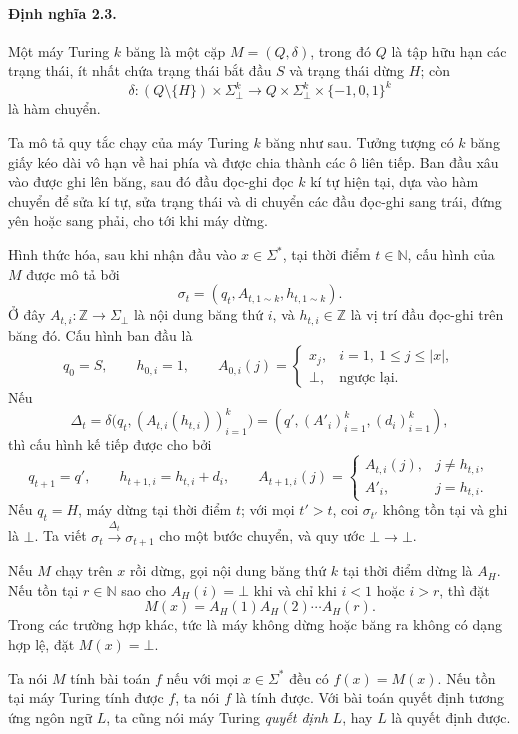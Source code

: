 \documentclass[11pt]{article}
\begin{document}
\paragraph{Định nghĩa 2.3.}
Một máy Turing \(k\) băng là một cặp \(M=(Q,\delta)\), trong đó \(Q\) là tập
hữu hạn các trạng thái, ít nhất chứa trạng thái bắt đầu \(S\) và trạng thái
dừng \(H\); còn
\[
  \delta:(Q\setminus\{H\})\times\Sigma_{\bot}^k
  \to Q\times\Sigma_{\bot}^k\times\{-1,0,1\}^k
\]
là hàm chuyển.

Ta mô tả quy tắc chạy của máy Turing \(k\) băng như sau. Tưởng tượng có \(k\)
băng giấy kéo dài vô hạn về hai phía và được chia thành các ô liên tiếp. Ban
đầu xâu vào được ghi lên băng, sau đó đầu đọc-ghi đọc \(k\) kí tự hiện tại, dựa
vào hàm chuyển để sửa kí tự, sửa trạng thái và di chuyển các đầu đọc-ghi sang
trái, đứng yên hoặc sang phải, cho tới khi máy dừng.

Hình thức hóa, sau khi nhận đầu vào \(x\in\Sigma^*\), tại thời điểm \(t\in
\mathbb N\), cấu hình của \(M\) được mô tả bởi
\[
  \sigma_t=(q_t,A_{t,1\sim k},h_{t,1\sim k}).
\]
Ở đây \(A_{t,i}:\mathbb Z\to\Sigma_{\bot}\) là nội dung băng thứ \(i\), và
\(h_{t,i}\in\mathbb Z\) là vị trí đầu đọc-ghi trên băng đó. Cấu hình ban đầu là
\[
  q_0=S,\qquad h_{0,i}=1,\qquad
  A_{0,i}(j)=
  \begin{cases}
    x_j,& i=1,\ 1\le j\le |x|,\\
    \bot,& \text{ngược lại.}
  \end{cases}
\]
Nếu
\[
  \Delta_t=\delta\bigl(q_t,(A_{t,i}(h_{t,i}))_{i=1}^{k}\bigr)
  =(q',(A'_i)_{i=1}^{k},(d_i)_{i=1}^{k}),
\]
thì cấu hình kế tiếp được cho bởi
\[
  q_{t+1}=q',\qquad h_{t+1,i}=h_{t,i}+d_i,\qquad
  A_{t+1,i}(j)=
  \begin{cases}
    A_{t,i}(j),& j\ne h_{t,i},\\
    A'_i,& j=h_{t,i}.
  \end{cases}
\]
Nếu \(q_t=H\), máy dừng tại thời điểm \(t\); với mọi \(t'>t\), coi
\(\sigma_{t'}\) không tồn tại và ghi là \(\bot\). Ta viết
\(\sigma_t\xrightarrow{\Delta_t}\sigma_{t+1}\) cho một bước chuyển, và quy ước
\(\bot\to\bot\).

Nếu \(M\) chạy trên \(x\) rồi dừng, gọi nội dung băng thứ \(k\) tại thời điểm
dừng là \(A_H\). Nếu tồn tại \(r\in\mathbb N\) sao cho \(A_H(i)=\bot\) khi và
chỉ khi \(i<1\) hoặc \(i>r\), thì đặt
\[
  M(x)=A_H(1)A_H(2)\cdots A_H(r).
\]
Trong các trường hợp khác, tức là máy không dừng hoặc băng ra không có dạng
hợp lệ, đặt \(M(x)=\bot\).

Ta nói \(M\) tính bài toán \(f\) nếu với mọi \(x\in\Sigma^*\) đều có
\(f(x)=M(x)\). Nếu tồn tại máy Turing tính được \(f\), ta nói \(f\) là tính
được. Với bài toán quyết định tương ứng ngôn ngữ \(L\), ta cũng nói máy Turing
\emph{quyết định} \(L\), hay \(L\) là quyết định được.
\end{document}
